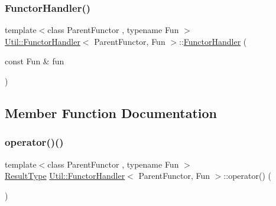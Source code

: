 \mbox{\label{classUtil_1_1FunctorHandler_aa8b8cd815a79a27be8585210d8dccdb5}} 
\subsubsection{\texorpdfstring{FunctorHandler()}{FunctorHandler()}\hspace{0.1cm}{\footnotesize\ttfamily [2/2]}}
{\footnotesize\ttfamily template$<$class Parent\+Functor , typename Fun $>$ \\
\mbox{\hyperlink{classUtil_1_1FunctorHandler}{Util\+::\+Functor\+Handler}}$<$ Parent\+Functor, Fun $>$\+::\mbox{\hyperlink{classUtil_1_1FunctorHandler}{Functor\+Handler}} (\begin{DoxyParamCaption}\item[{const Fun \&}]{fun }\end{DoxyParamCaption})\hspace{0.3cm}{\ttfamily [inline]}}



\subsection{Member Function Documentation}
\mbox{\label{classUtil_1_1FunctorHandler_a568e55043d17f0034572b4ad2772391e}} 
\subsubsection{\texorpdfstring{operator()()}{operator()()}\hspace{0.1cm}{\footnotesize\ttfamily [1/12]}}
{\footnotesize\ttfamily template$<$class Parent\+Functor , typename Fun $>$ \\
\mbox{\hyperlink{classUtil_1_1FunctorHandler_a036da44b8cc2567704cebd2a20d16c80}{Result\+Type}} \mbox{\hyperlink{classUtil_1_1FunctorHandler}{Util\+::\+Functor\+Handler}}$<$ Parent\+Functor, Fun $>$\+::operator() (\begin{DoxyParamCaption}{ }\end{DoxyParamCaption})\hspace{0.3cm}{\ttfamily [inline]}}

